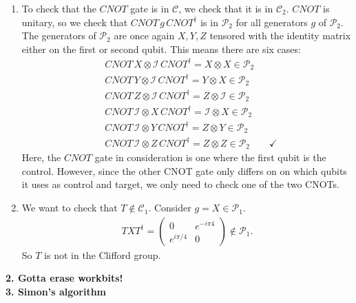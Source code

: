 \documentclass{article}
\theoremstyle{definition}
\newcommand{\Id}{\mathcal{I}}
\begin{document}
\begin{enumerate}[label=(\alph*)]
	\item To check that the $CNOT$ gate is in $\mathcal{C}$, we check that it is in $\mathcal{C}_2$. $CNOT$ is unitary, so we check that $CNOT \, g \, CNOT^\dagger$ is in $\mathcal{P}_2$ for all generators $g$ of $\mathcal{P}_2$. The generators of $\mathcal{P}_2$ are once again $X,Y,Z$ tensored with the identity matrix either on the first or second qubit. This means there are six cases:
	 \begin{align*}
	 	&CNOT\,X \otimes \Id \,CNOT^\dagger = X\otimes X \in \mathcal{P}_2 \\
	 	&CNOT\,Y \otimes \Id \,CNOT^\dagger = Y\otimes X \in \mathcal{P}_2 \\
	 	&CNOT\,Z \otimes \Id \,CNOT^\dagger = Z\otimes \Id \in \mathcal{P}_2 \\
	 	&CNOT\,\Id \otimes X \,CNOT^\dagger = \Id \otimes X \in \mathcal{P}_2 \\
	 	&CNOT\,\Id \otimes Y \,CNOT^\dagger = Z \otimes Y \in \mathcal{P}_2 \\
	 	&CNOT\,\Id \otimes Z \,CNOT^\dagger = Z \otimes Z \in \mathcal{P}_2 \quad\quad \checkmark
	 \end{align*}
 	Here, the $CNOT$ gate in consideration is one where the first qubit is the control. However, since the other CNOT gate only differs on on which qubits it uses as control and target, we only need to check one of the two CNOTs.
	
	\item We want to check that $T\notin \mathcal{C}_1$. Consider $g = X\in \mathcal{P}_1$. 
	\begin{align*}
		TXT^\dagger = \begin{pmatrix}
			0 & e^{-i\pi4} \\ e^{i\pi/4} & 0
		\end{pmatrix} \notin \mathcal{P}_1.
	\end{align*}
	So $T$ is not in the Clifford group.
\end{enumerate}



\noindent \textbf{2. Gotta erase workbits!}\\




\noindent \textbf{3. Simon's algorithm}
\end{document}

